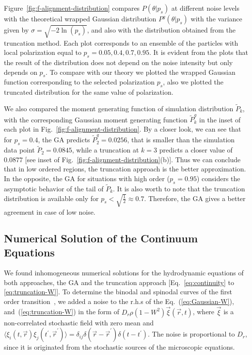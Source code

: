 \documentclass[reprint,floatfix,amsmath,amssymb,aps,pre,showkeys,showpacs,superscriptaddress]{revtex4-1}
\newcommand{\ave}[1]{\langle #1 \rangle}
\newcommand{\p}{p}
\newcommand{\w}{W}
\newcommand{\hl}[1]{\textcolor{hlcolor}{#1}}
\newcommand{\reqs}[2]{Eq.~(\ref{#1}), and~(\ref{#2})}
\begin{document}
Figure~\ref{fig:f-alignment-distribution} compares $P(\theta|p_s)$ at different noise levels with the theoretical wrapped Gaussian distribution $P^g(\theta|p_s)$ with \hl{the} variance given by $\sigma= \sqrt{-2 \ln(\p_s)}$, and also with the distribution obtained from the truncation method. Each plot corresponds to an ensemble of the particles with local polarization equal to $\p_s=0.05,0.4,0.7,0.95$. It is evident from the plots that the result of the distribution does not depend on the noise intensity but only depends on $\p_s$. To compare with \hl{our} theory we plotted the wrapped Gaussian function corresponding to the selected polarization $\p_s$, also we plotted the truncated distribution for the same value of polarization. 

We also compared the moment generating function of simulation distribution $\tilde{P}_k$, with the corresponding Gaussian moment generating function $\tilde{P}^{g}_k$ in the inset of each plot in Fig.~\ref{fig:f-alignment-distribution}. By a closer look, we can see that for $\p_s = 0.4$, the GA predicts $\tilde{P}^g_2= 0.0256$, that is smaller than the simulation data point $\tilde{P}_2 = 0.0845$, while a truncation at $k=3$ predicts a closer value of $0.0877$ [see inset of Fig.~\ref{fig:f-alignment-distribution}(b)]. Thus we can conclude that in low ordered regions, the truncation approach is the better approximation. In the opposite, the GA for situations with high order ($\p_s=0.95$) considers the asymptotic behavior of the tail of $\tilde{P}_k$. It is also worth to note that the truncation distribution is available only for $\p_s < \sqrt{\frac{1}{2}} \approx 0.7$. Therefore, the GA gives a better \hl{agreement in case of low noise.}

\subsection{Numerical Solution of the Continuum Equations}
\label{subsec:PDE-solution}

We found inhomogeneous numerical solutions \hl{for the hydrodynamic equations of both approaches, the GA and the truncation approach} [Eq.~\eqref{eq:continuity} to \eqref{eq:truncation-W}]. To determine the binodal and spinodal curves of the first order transition~\cite{solon2015from}, we added a noise to the r.h.s of the \reqs{eq:Gaussian-W}{eq:truncation-W} in the form of $D_r \rho (1-\w^2) \vec{\xi}(\vec{r},t)$, where $\vec{\xi}$ is a non-correlated stochastic field with zero mean and $\ave{\xi_i(t,\vec{r}) \xi_j(t^\prime,\vec{r}^\prime)} = \delta_{ij} \delta(\vec{r} - \vec{r}^\prime) \delta (t - t^\prime)$. The noise is proportional to $D_r$, since it is originated from the stochastic \hl{sources} of \hl{the} microscopic equations. 
\end{document}
